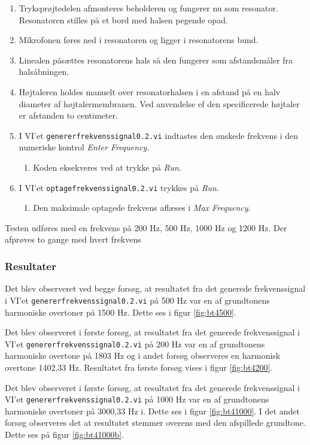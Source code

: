 			\begin{enumerate}
				\item Tryksprøjtedelen afmonteres beholderen og fungerer nu som resonator. Resonatoren stilles på et bord med halsen pegende opad. 
				\item Mikrofonen føres ned i resonatoren og ligger i resonatorens bund. 
				\item Linealen påsættes resonatorens hals så den fungerer som afstandsmåler fra halsåbningen.
				\item Højtaleren holdes manuelt over resonatorhalsen i en afstand på en halv diameter af højtalermembranen. Ved anvendelse ef den specificerede højtaler er afstanden to centimeter. 
				\item I VI'et \texttt{genererfrekvenssignal0.2.vi} indtastes den ønskede frekvens i den numeriske kontrol \textit{Enter Frequency}. 
					\begin{enumerate}
						\item Koden eksekveres ved at trykke på \textit{Run}. 
					\end{enumerate} 
				\item I VI'et \texttt{optagefrekvenssignal0.2.vi} trykkes på \textit{Run}. 
					\begin{enumerate}
						\item Den maksimale optagede frekvens aflæses i \textit{Max Frequency}. 
					\end{enumerate}	 	
			\end{enumerate}
			
			
			Testen udføres med en frekvens på 200 Hz, 500 Hz, 1000 Hz og 1200 Hz. Der afprøves to gange med hvert frekvens  
			
			\subsubsection{Resultater}
			Det blev observeret ved begge forsøg, at resultatet fra det generede frekvenssignal i VI'et \texttt{genererfrekvenssignal0.2.vi} på 500 Hz var en af grundtonens harmoniske overtoner på 1500 Hz. Dette ses i figur \ref{fig:bt4500}. 

			 Det blev observeret i første forsøg, at resultatet fra det generede frekvenssignal i VI'et \texttt{genererfrekvenssignal0.2.vi} på 200 Hz var en af grundtonens harmoniske overtone på 1803 Hz og i andet forsøg observeres en harmonisk overtone 1402,33 Hz. Resultatet fra første forsøg vises i figur \ref{fig:bt4200}.
			 
			 Det blev observeret i første forsøg, at resultatet fra det generede frekvenssignal i VI'et \texttt{genererfrekvenssignal0.2.vi} på 1000 Hz var en af grundtonens harmoniske overtoner på 3000,33 Hz i. Dette ses i figur \ref{fig:bt41000}. I det andet forsøg observeres det at resultatet stemmer overens med den afspillede grundtone. Dette ses på figur \ref{fig:bt41000b}.  
			 

